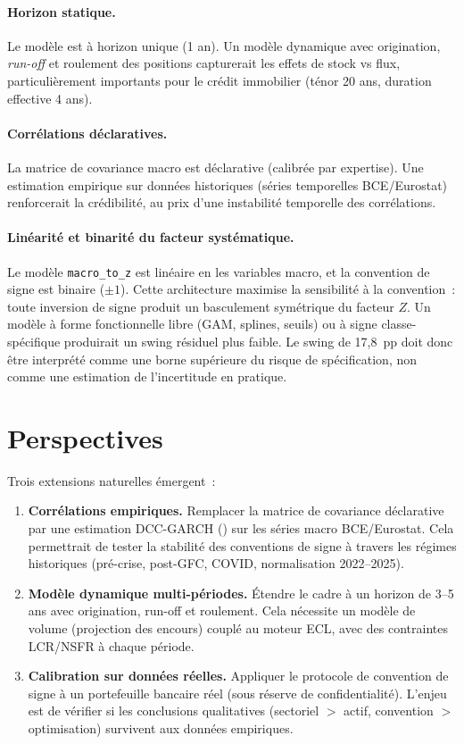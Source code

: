\documentclass[12pt, a4paper, twoside, openright]{report}
\theoremstyle{definition}
\begin{document}
\paragraph{Horizon statique.} Le modèle est à horizon unique (1 an). Un modèle dynamique avec origination, \textit{run-off} et roulement des positions capturerait les effets de stock vs flux, particulièrement importants pour le crédit immobilier (ténor 20 ans, duration effective 4 ans).

\paragraph{Corrélations déclaratives.} La matrice de covariance macro est déclarative (calibrée par expertise). Une estimation empirique sur données historiques (séries temporelles BCE/Eurostat) renforcerait la crédibilité, au prix d'une instabilité temporelle des corrélations.

\paragraph{Linéarité et binarité du facteur systématique.} Le modèle \texttt{macro\_to\_z} est linéaire en les variables macro, et la convention de signe est binaire ($\pm 1$). Cette architecture maximise la sensibilité à la convention~: toute inversion de signe produit un basculement symétrique du facteur $Z$. Un modèle à forme fonctionnelle libre (GAM, splines, seuils) ou à signe classe-spécifique produirait un swing résiduel plus faible. Le swing de 17,8~pp doit donc être interprété comme une borne supérieure du risque de spécification, non comme une estimation de l'incertitude en pratique.

\section*{Perspectives}

Trois extensions naturelles émergent~:

\begin{enumerate}
\item \textbf{Corrélations empiriques.} Remplacer la matrice de covariance déclarative par une estimation DCC-GARCH (\citealt{engle2002}) sur les séries macro BCE/Eurostat. Cela permettrait de tester la stabilité des conventions de signe à travers les régimes historiques (pré-crise, post-GFC, COVID, normalisation 2022--2025).

\item \textbf{Modèle dynamique multi-périodes.} Étendre le cadre à un horizon de 3--5 ans avec origination, run-off et roulement. Cela nécessite un modèle de volume (projection des encours) couplé au moteur ECL, avec des contraintes LCR/NSFR à chaque période.

\item \textbf{Calibration sur données réelles.} Appliquer le protocole de convention de signe à un portefeuille bancaire réel (sous réserve de confidentialité). L'enjeu est de vérifier si les conclusions qualitatives (sectoriel $>$ actif, convention $>$ optimisation) survivent aux données empiriques.
\end{enumerate}
\end{document}
